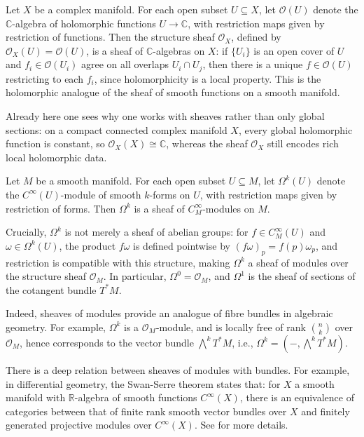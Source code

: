 \documentclass[11pt]{article}
\begin{document}
\begin{example}
Let \(X\) be a complex manifold. For each open subset \(U\subseteq X\), 
let \(\mathcal{O}(U)\) denote the \(\mathbb{C}\)-algebra of holomorphic 
functions \(U\to \mathbb{C}\), with restriction maps given by restriction 
of functions. Then the structure sheaf \(\mathscr{O}_X\), defined by 
\(\mathscr{O}_X(U)=\mathcal{O}(U)\), is a sheaf of \(\mathbb{C}\)-algebras 
on \(X\): if \(\{U_i\}\) is an open cover of \(U\) and 
\(f_i\in\mathcal{O}(U_i)\) agree on all overlaps \(U_i\cap U_j\), then 
there is a unique \(f\in\mathcal{O}(U)\) restricting to each \(f_i\), 
since holomorphicity is a local property. This is the holomorphic analogue 
of the sheaf of smooth functions on a smooth manifold. 

Already here one sees why one works with sheaves rather than only global 
sections: on a compact connected complex manifold \(X\), every global 
holomorphic function is constant, so \(\mathscr{O}_X(X)\cong\mathbb{C}\), 
whereas the sheaf \(\mathscr{O}_X\) still encodes rich local holomorphic data.
        \item Let \(M\) be a smooth manifold. For each open subset \(U\subseteq M\), let
\(\Omega^k(U)\) denote the \(C^\infty(U)\)-module of smooth \(k\)-forms on
\(U\), with restriction maps given by restriction of forms. Then
\(\Omega^k\) is a sheaf of \(C^\infty_M\)-modules on \(M\). 

Crucially, \(\Omega^k\) is not merely a
sheaf of abelian groups: for \(f\in C^\infty_M(U)\) and
\(\omega\in\Omega^k(U)\), the product \(f\omega\) is defined pointwise by
\((f\omega)_p=f(p)\omega_p\), and restriction is compatible with this
structure, making \(\Omega^k\) a sheaf of modules over the structure sheaf
\(\mathscr{O}_{M}\). In particular, \(\Omega^0=\mathscr{O}_{M}\), and \(\Omega^1\) is
the sheaf of sections of the cotangent bundle \(T^*M\). 

Indeed, sheaves of modules provide an analogue of fibre bundles 
in algebraic geometry.
For example, $ \Omega^{k} $ is a $ \mathscr{O}_{M} $-module, 
and is locally free of rank $ \binom{n}{k}$ over $ \mathscr{O}_{M} $,  
hence corresponds to the vector bundle \(\bigwedge^k T^*M\), 
i.e., $ \Omega^{k} = (-,\bigwedge^k T^*M) $. 

There is a deep relation between sheaves of modules with bundles. 
For example, in differential geometry, the Swan-Serre theorem states
that: 
for $ X $ a smooth manifold with $ \mathbb{R} $-algebra of 
smooth functions $ C^{\infty}(X) $, there is an equivalence of 
categories between that of finite rank smooth vector bundles over $ X $ 
and finitely generated projective modules over $ C^{\infty}(X) $. 
See \cite[Chapter 12]{nes} for more details. 
\end{example}
\end{document}
